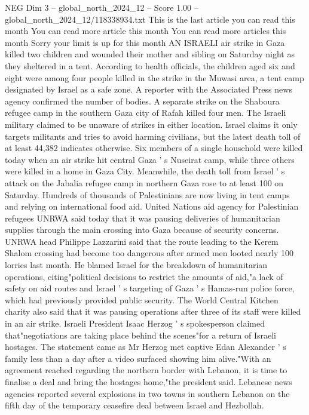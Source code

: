 \begin{textsample}{NEG Dim 3 – global\_north\_2024\_12 – Score 1.00 – global\_north\_2024\_12/118338934.txt}  \label{ex:f3_neg_250}
This is the last article you can read this month You can read more article this month You can read more articles this month Sorry your limit is up for this month AN ISRAELI air strike in Gaza killed two children and wounded their mother and sibling on Saturday night as they sheltered in a tent.
According to health officials, the children aged six and eight were among four people killed in the strike in the Muwasi area, a tent camp designated by Israel as a safe zone.
A reporter with the Associated Press news agency confirmed the number of bodies.
A separate strike on the Shaboura refugee camp in the southern Gaza city of Rafah killed four men.
The Israeli military claimed to be unaware of strikes in either location.
Israel claims it only targets militants and tries to avoid harming civilians, but the latest death toll of at least 44,382 indicates otherwise.
Six members of a single household were killed today when an air strike hit central Gaza ' s Nuseirat camp, while three others were killed in a home in Gaza City.
Meanwhile, the death toll from Israel ' s attack on the Jabalia refugee camp in northern Gaza rose to at least 100 on Saturday.
Hundreds of thousands of Palestinians are now living in tent camps and relying on international food aid.
United Nations aid agency for Palestinian refugees UNRWA said today that it was pausing deliveries of humanitarian supplies through the main crossing into Gaza because of security concerns.
UNRWA head Philippe Lazzarini said that the route leading to the Kerem Shalom crossing had become too dangerous after armed men looted nearly 100 lorries last month.
He blamed Israel for the breakdown of humanitarian operations, citing"political decisions to restrict the amounts of aid,"a lack of safety on aid routes and Israel ' s targeting of Gaza ' s Hamas-run police force, which had previously provided public security.
The World Central Kitchen charity also said that it was pausing operations after three of its staff were killed in an air strike.
Israeli President Isaac Herzog ' s spokesperson claimed that"negotiations are taking place behind the scenes"for a return of Israeli hostages.
The statement came as Mr Herzog met captive Edan Alexander ' s family less than a day after a video surfaced showing him alive."With an agreement reached regarding the northern border with Lebanon, it is time to finalise a deal and bring the hostages home,"the president said.
Lebanese news agencies reported several explosions in two towns in southern Lebanon on the fifth day of the temporary ceasefire deal between Israel and Hezbollah.

\end{textsample}
